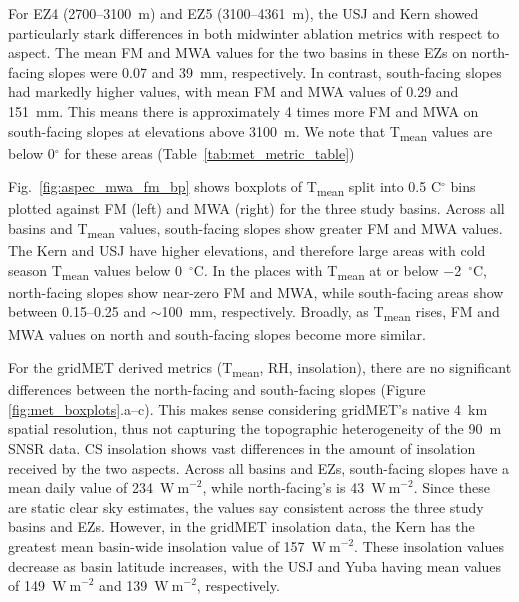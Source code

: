 For EZ4 (2700--3100~m) and EZ5 (3100--4361~m), the USJ and Kern showed particularly stark differences in both midwinter ablation metrics with respect to aspect. The mean FM and MWA values for the two basins in these EZs on north-facing slopes were 0.07 and 39~mm, respectively. In contrast, south-facing slopes had markedly higher values, with mean FM and MWA values of 0.29 and 151~mm. This means there is approximately 4 times more FM and MWA on south-facing slopes at elevations above 3100~m. We note that T\textsubscript{mean} values are below 0$^{\circ}$ for these areas (Table~\ref{tab:met_metric_table})

Fig.~\ref{fig:aspec_mwa_fm_bp} shows boxplots of T\textsubscript{mean} split into 0.5 C$^{\circ}$ bins plotted against FM (left) and MWA (right) for the three study basins. Across all basins and T\textsubscript{mean} values, south-facing slopes show greater FM and MWA values.  The Kern and USJ have higher elevations, and therefore large areas with cold season T\textsubscript{mean} values below 0~$^{\circ}$C. In the places with T\textsubscript{mean} at or below $-$2~$^{\circ}$C, north-facing slopes show near-zero FM and MWA, while south-facing areas show between 0.15--0.25 and $\sim$100~mm, respectively. Broadly, as T\textsubscript{mean} rises, FM and MWA values on north and south-facing slopes become more similar.

For the gridMET derived metrics (T\textsubscript{mean}, RH, insolation), there are no significant differences between the north-facing and south-facing slopes (Figure \ref{fig:met_boxplots}.a--c). This makes sense considering gridMET's native 4~km spatial resolution, thus not capturing the topographic heterogeneity of the 90~m SNSR data. CS insolation shows vast differences in the amount of insolation received by the two aspects. Across all basins and EZs, south-facing slopes have a mean daily value of 234~$\mathrm{W~m}^{-2}$, while north-facing's is 43~$\mathrm{W~m}^{-2}$. Since these are static clear sky estimates, the values say consistent across the three study basins and EZs. However, in the gridMET insolation data, the Kern has the greatest mean basin-wide insolation value of 157~$\mathrm{W~m}^{-2}$. These insolation values decrease as basin latitude increases, with the USJ and Yuba having mean values of 149~$\mathrm{W~m}^{-2}$ and 139~$\mathrm{W~m}^{-2}$, respectively.

